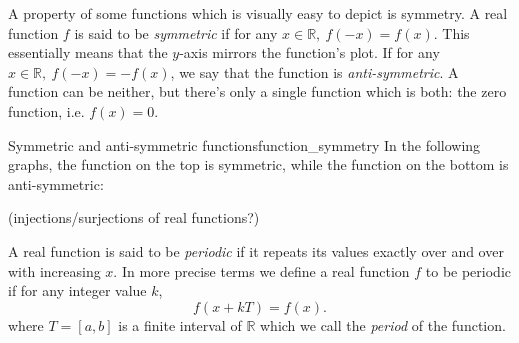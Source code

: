 A property of some functions which is visually easy to depict is symmetry. A real function $f$ is said to be \emph{symmetric} if for any $x\in\mathbb{R},\ f(-x)=f(x)$. This essentially means that the $y$-axis mirrors the function's plot. If for any $x\in\mathbb{R},\ f(-x)=-f(x)$, we say that the function is \emph{anti-symmetric}. A function can be neither, but there's only a single function which is both: the zero function, i.e. $f(x)=0$.

\begin{example}{Symmetric and anti-symmetric functions}{function_symmetry}
	In the following graphs, the function on the top is symmetric, while the function on the bottom is anti-symmetric:
	\begin{figure}[H]
		\centering

	\end{figure}
\end{example}

(injections/surjections of real functions?)
 
A real function is said to be \emph{periodic} if it repeats its values exactly over and over with increasing $x$. In more precise terms we define a real function $f$ to be periodic if for any integer value $k$,
\begin{equation}
	f(x+kT) = f(x).
	\label{eq:periodic function}
\end{equation}
where $T=[a,b]$ is a finite interval of $\mathbb{R}$ which we call the \emph{period} of the function.


